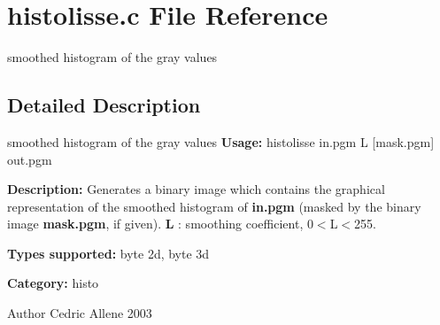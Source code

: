\section{histolisse.c File Reference}
\label{histolisse_8c}


smoothed histogram of the gray values  




\subsection{Detailed Description}
smoothed histogram of the gray values {\bfseries Usage:} histolisse in.pgm L [mask.pgm] out.pgm

{\bfseries Description:} Generates a binary image which contains the graphical representation of the smoothed histogram of {\bfseries in.pgm} (masked by the binary image {\bfseries mask.pgm}, if given). {\bfseries L} : smoothing coefficient, 0$<$L$<$255.

{\bfseries Types supported:} byte 2d, byte 3d

{\bfseries Category:} histo

\begin{DoxyAuthor}{Author}
Cedric Allene 2003 
\end{DoxyAuthor}
